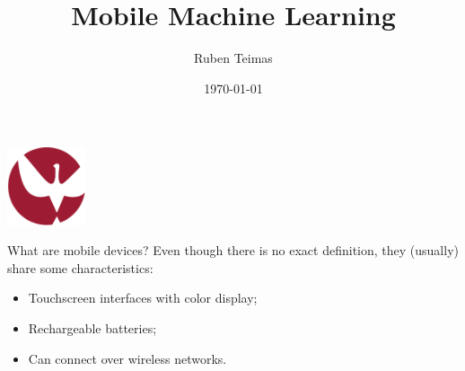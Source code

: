 \documentclass[dvipsnames, handout]{beamer}
\newcommand{\1}{\mathds{1}}	%
\begin{document}

\title{\color{titleText}Mobile Machine Learning}
\author{Ruben Teimas\vspace{-.3cm}}

\begin{frame}
\titlepage
\vspace{-1.2cm}
\begin{center}
\includegraphics[width=2.3cm]{presentation/uevora_logo.png}\bigskip
\date{\today}
\end{center}
\end{frame}





\begin{frame}{What are mobile devices?}
Even though there is no exact definition, they (usually) share some characteristics: 
\pause
\begin{itemize}
\item Touchscreen interfaces with color display;
\item Rechargeable batteries;
\item Can connect over wireless networks.
\end{itemize}
\end{frame}
\end{document}
